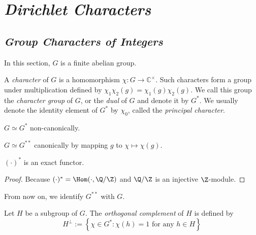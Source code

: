 \chapter{\emph{Dirichlet Characters}}


\section{\emph{Group Characters of Integers}}

\begin{notation}
    In this section, $G$ is a finite abelian group.
\end{notation}

\begin{definition}
    A \emph{character} of $G$ is a homomorphism $\chi: G \to \mathbb{C}^{\times}$. Such characters form a group under multiplication defined by $\chi_1\chi_2(g)=\chi_1(g)\chi_2(g)$. We call this group the \emph{character group} of $G$, or the \emph{dual} of $G$ and denote it by $G^*$. We usually denote the identity element of $G^*$ by $\chi_0$, called the \emph{principal character}.
\end{definition}

\begin{proposition}
    $G\simeq G^*$ non-canonically.
\end{proposition}

\begin{proposition}
    $G\simeq G^{**}$ canonically by mapping $g$ to $\chi\mapsto\chi(g)$.
\end{proposition}

\begin{proposition}
    $(\cdot)^*$ is an exact functor.
\end{proposition}

\begin{proof}
    Because $(\cdot)^*=\Hom(\cdot,\Q/\Z)$ and $\Q/\Z$ is an injective $\Z$-module.
\end{proof}

\begin{notation}
    From now on, we identify $G^{**}$ with $G$.
\end{notation}

\begin{definition}
    Let $H$ be a subgroup of $G$. The \emph{orthogonal complement} of $H$ is defined by $$ H^\perp:=\left\{\chi\in G^*:\chi(h)=1\text{ for any }h\in H\right\} $$
\end{definition}

